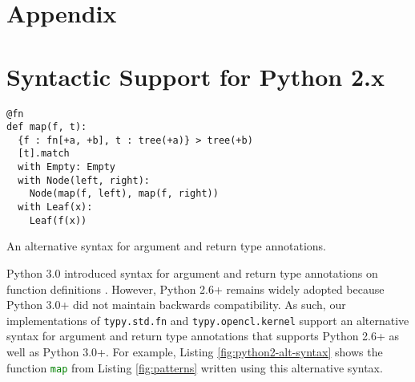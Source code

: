 \documentclass[10pt]{sigplanconf}
\newif\ifext
\newcommand{\lip}[1]{\lstinline[language=Python,basicstyle=\ttfamily\footnotesize,morekeywords={with},deletendkeywords={tuple,buffer,map}]{#1}}
\newcommand{\li}[1]{\lip{#1}}
\begin{document}
\ifext
\clearpage
\appendix
\section*{Appendix}
\section{Syntactic Support for Python 2.x}\label{sec:python2-support}
\begin{codelisting}[h!]
\vspace{-3px}
\begin{lstlisting}
@fn
def map(f, t):
  {f : fn[+a, +b], t : tree(+a)} > tree(+b)
  [t].match 
  with Empty: Empty 
  with Node(left, right): 
    Node(map(f, left), map(f, right))
  with Leaf(x):
    Leaf(f(x)) 
\end{lstlisting}
\caption{An alternative syntax for argument and return type annotations.}
\label{fig:python2-alt-syntax}
\end{codelisting}

\noindent Python 3.0 introduced syntax for argument and return type annotations on function definitions \cite{pep3107}. However, Python 2.6+ remains widely adopted because Python 3.0+ did not maintain backwards compatibility. As such, our implementations of \li{typy.std.fn} and \li{typy.opencl.kernel} support an alternative syntax for argument and return type annotations that supports Python 2.6+ as well as Python 3.0+. For example, Listing \ref{fig:python2-alt-syntax} shows the function \li{map} from Listing \ref{fig:patterns} written using this alternative syntax.
\end{document}
